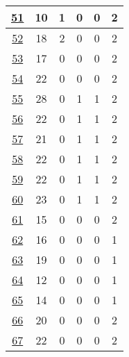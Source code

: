 \begin{table}
\begin{center}
\begin{tabular}{|c|c|c|c|c|c|}
			\hline
			\href{https://purl.org/emi#examples011b}{51} & 10 & 1 & 0 & 0 & 2 \\
			\hline
			\href{https://purl.org/emi#examples019a}{52} & 18 & 2 & 0 & 0 & 2 \\
			\hline
			\href{https://purl.org/emi#examples019b}{53} & 17 & 0 & 0 & 0 & 2 \\
			\hline
			\href{https://biosoda.unil.ch/emi/sparql/.well-known/sparql-examples/009}{54} & 22 & 0 & 0 & 0 & 2 \\
			\hline
			\href{https://purl.org/emi#examples013}{55} & 28 & 0 & 1 & 1 & 2 \\
			\hline
			\href{https://purl.org/emi#examples015}{56} & 22 & 0 & 1 & 1 & 2 \\
			\hline
			\href{https://purl.org/emi#examples018}{57} & 21 & 0 & 1 & 1 & 2 \\
			\hline
			\href{https://purl.org/emi#examples012}{58} & 22 & 0 & 1 & 1 & 2 \\
			\hline
			\href{https://purl.org/emi#examples021}{59} & 22 & 0 & 1 & 1 & 2 \\
			\hline
			\href{https://biosoda.unil.ch/emi/sparql/.well-known/sparql-examples/007}{60} & 23 & 0 & 1 & 1 & 2 \\
			\hline
			\href{https://biosoda.unil.ch/emi/sparql/.well-known/sparql-examples/002}{61} & 15 & 0 & 0 & 0 & 2 \\
			\hline
			\href{https://sparql.uniprot.org/.well-known/sparql-examples/116_biosodafrontend_rabit_mouse_orthologs}{62} & 16 & 0 & 0 & 0 & 1 \\
			\hline
			\href{https://sparql.omabrowser.org/.well-known/sparql-examples/15-rat-TP53-biosodafrontend}{63} & 19 & 0 & 0 & 0 & 1 \\
			\hline
			\href{https://www.bgee.org/sparql/.well-known/sparql-examples/027-biosodafrontend}{64} & 12 & 0 & 0 & 0 & 1 \\
			\hline
			\href{https://www.bgee.org/sparql/.well-known/sparql-examples/028-biosodafrontend}{65} & 14 & 0 & 0 & 0 & 1 \\
			\hline
			\href{https://sparql.uniprot.org/.well-known/sparql-examples/117_biosodafrontend_glioblastoma_orthologs_rat}{66} & 20 & 0 & 0 & 0 & 2 \\
			\hline
			\href{https://sparql.uniprot.org/.well-known/sparql-examples/118_biosodafrontend_rat_brain_human_cancer}{67} & 22 & 0 & 0 & 0 & 2 \\
			\hline
		\end{tabular}
	\end{center}
\end{table}